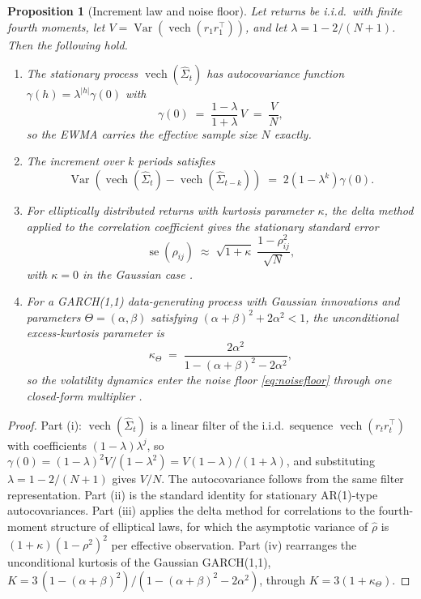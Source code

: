 \documentclass[11pt]{article}
\newtheorem{proposition}{Proposition}
\theoremstyle{remark}
\newcommand{\vech}{\operatorname{vech}}
\begin{document}
\begin{proposition}[Increment law and noise floor]
\label{prop:increments}
Let returns be i.i.d.\ with finite fourth moments, let
$V = \operatorname{Var}\!\left(\vech(r_1 r_1^{\top})\right)$, and let
$\lambda = 1 - 2/(N+1)$. Then the following hold.
\begin{enumerate}
\item[(i)] The stationary process $\vech(\widehat{\Sigma}_t)$ has
autocovariance function $\gamma(h) = \lambda^{|h|} \gamma(0)$ with
\begin{equation}
\gamma(0) \;=\; \frac{1-\lambda}{1+\lambda}\, V \;=\; \frac{V}{N},
\label{eq:statvar}
\end{equation}
so the EWMA carries the effective sample size $N$ exactly.
\item[(ii)] The increment over $k$ periods satisfies
\begin{equation}
\operatorname{Var}\!\left( \vech(\widehat{\Sigma}_t)
- \vech(\widehat{\Sigma}_{t-k}) \right)
\;=\; 2\left(1 - \lambda^{k}\right) \gamma(0).
\label{eq:kstep}
\end{equation}
\item[(iii)] For elliptically distributed returns with kurtosis parameter
$\kappa$, the delta method applied to the correlation coefficient gives the
stationary standard error
\begin{equation}
\operatorname{se}\!\left(\widehat{\rho}_{ij}\right)
\;\approx\; \sqrt{1+\kappa}\; \frac{1-\rho_{ij}^2}{\sqrt{N}},
\label{eq:noisefloor}
\end{equation}
with $\kappa = 0$ in the Gaussian case
\citep{neudecker1990asymptotic}.
\item[(iv)] For a GARCH(1,1) data-generating process with Gaussian innovations
and parameters $\Theta = (\alpha, \beta)$ satisfying
$(\alpha+\beta)^2 + 2\alpha^2 < 1$, the unconditional excess-kurtosis parameter
is
\begin{equation}
\kappa_{\Theta} \;=\; \frac{2\alpha^2}{1 - (\alpha+\beta)^2 - 2\alpha^2},
\label{eq:garchkappa}
\end{equation}
so the volatility dynamics enter the noise floor \eqref{eq:noisefloor} through
one closed-form multiplier \citep{bollerslev1986generalized}.
\end{enumerate}
\end{proposition}

\begin{proof}
Part (i): $\vech(\widehat{\Sigma}_t)$ is a linear filter of the i.i.d.\
sequence $\vech(r_t r_t^{\top})$ with coefficients $(1-\lambda)\lambda^{j}$, so
$\gamma(0) = (1-\lambda)^2 V / (1-\lambda^2) = V(1-\lambda)/(1+\lambda)$, and
substituting $\lambda = 1 - 2/(N+1)$ gives $V/N$. The autocovariance follows
from the same filter representation. Part (ii) is the standard identity for
stationary AR(1)-type autocovariances. Part (iii) applies the delta method for
correlations to the fourth-moment structure of elliptical laws, for which the
asymptotic variance of $\widehat{\rho}$ is $(1+\kappa)(1-\rho^2)^2$ per
effective observation. Part (iv) rearranges the unconditional kurtosis of the
Gaussian GARCH(1,1), $K = 3\,(1-(\alpha+\beta)^2)/(1-(\alpha+\beta)^2-2\alpha^2)$,
through $K = 3(1+\kappa_{\Theta})$.
\end{proof}
\end{document}
